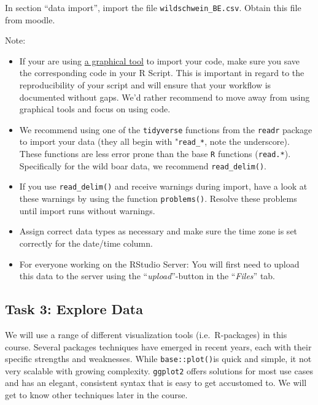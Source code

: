 \documentclass[]{book}
\providecommand{\tightlist}{%
  \setlength{\itemsep}{0pt}\setlength{\parskip}{0pt}}
\begin{document}
In section ``data import'', import the file \texttt{wildschwein\_BE.csv}. Obtain this file from moodle.

Note:

\begin{itemize}
\tightlist
\item
  If your are using \href{https://support.rstudio.com/hc/en-us/articles/218611977-Importing-Data-with-RStudio}{a graphical tool} to import your code, make sure you save the corresponding code in your R Script. This is important in regard to the reproducibility of your script and will ensure that your workflow is documented without gaps. We'd rather recommend to move away from using graphical tools and focus on using code.
\item
  We recommend using one of the \texttt{tidyverse} functions from the \texttt{readr} package to import your data (they all begin with "\texttt{read\_*}, note the underscore). These functions are less error prone than the base \texttt{R} functions (\texttt{read.*}). Specifically for the wild boar data, we recommend \texttt{read\_delim()}.
\item
  If you use \texttt{read\_delim()} and receive warnings during import, have a look at these warnings by using the function \texttt{problems()}. Resolve these problems until import runs without warnings.
\item
  Assign correct data types as necessary and make sure the time zone is set correctly for the date/time column.
\item
  For everyone working on the RStudio Server: You will first need to upload this data to the server using the ``\emph{upload}''-button in the ``\emph{Files}'' tab.
\end{itemize}

\hypertarget{task-3-explore-data}{%
\subsection{Task 3: Explore Data}\label{task-3-explore-data}}

We will use a range of different visualization tools (i.e.~R-packages) in this course. Several packages techniques have emerged in recent years, each with their specific strengths and weaknesses. While \texttt{base::plot()}is quick and simple, it not very scalable with growing complexity. \texttt{ggplot2} offers solutions for most use cases and has an elegant, consistent syntax that is easy to get accustomed to. We will get to know other techniques later in the course.
\end{document}

